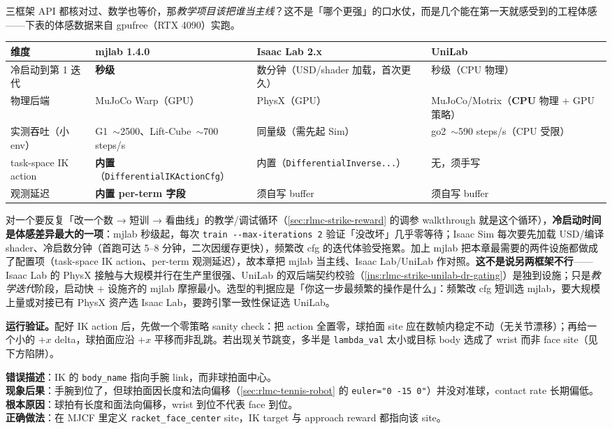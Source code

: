三框架 API 都核对过、数学也等价，那\emph{教学项目该把谁当主线}？这不是「哪个更强」的口水仗，而是几个能在第一天就感受到的工程体感——下表的体感数据来自 gpufree（RTX 4090）实跑。

\begin{center}
\small
\begin{tabular}{@{}llll@{}}
\toprule
维度 & mjlab 1.4.0 & Isaac Lab 2.x & UniLab \\
\midrule
冷启动到第 1 迭代 & \textbf{秒级} & 数分钟（USD/shader 加载，首次更久） & 秒级（CPU 物理） \\
物理后端 & MuJoCo Warp（GPU） & PhysX（GPU） & MuJoCo/Motrix（\textbf{CPU} 物理 $+$ GPU 策略） \\
实测吞吐（小 env） & G1 \,$\sim$2500、Lift-Cube \,$\sim$700 steps/s & 同量级（需先起 Sim） & go2 \,$\sim$590 steps/s（CPU 受限） \\
task-space IK action & \textbf{内置}（\verb|DifferentialIKActionCfg|） & 内置（\verb|DifferentialInverse...|） & 无，须手写 \\
观测延迟 & \textbf{内置 per-term 字段} & 须自写 buffer & 须自写 buffer \\
\bottomrule
\end{tabular}
\end{center}

\noindent{}对一个要反复「改一个数 → 短训 → 看曲线」的教学/调试循环（\cref{sec:rlmc-strike-reward} 的调参 walkthrough 就是这个循环），\textbf{冷启动时间是体感差异最大的一项}：mjlab 秒级起，每次 \verb|train --max-iterations 2| 验证「没改坏」几乎零等待；Isaac Sim 每次要先加载 USD/编译 shader、冷启数分钟（首跑可达 5--8 分钟，二次因缓存更快），频繁改 cfg 的迭代体验受拖累。加上 mjlab 把本章最需要的两件设施都做成了配置项（task-space IK action、per-term 观测延迟），故本章把 mjlab 当主线、Isaac Lab/UniLab 作对照。\textbf{这不是说另两框架不行}——Isaac Lab 的 PhysX 接触与大规模并行在生产里很强、UniLab 的双后端契约校验（\cref{ins:rlmc-strike-unilab-dr-gating}）是独到设施；只是\emph{教学迭代}阶段，启动快 $+$ 设施齐的 mjlab 摩擦最小。选型的判据应是「你这一步最频繁的操作是什么」：频繁改 cfg 短训选 mjlab，要大规模上量或对接已有 PhysX 资产选 Isaac Lab，要跨引擎一致性保证选 UniLab。

\textbf{运行验证。}配好 IK action 后，先做一个零策略 sanity check：把 action 全置零，球拍面 site 应在数帧内稳定不动（无关节漂移）；再给一个小的 $+x$ delta，球拍面应沿 $+x$ 平移而非乱跳。若出现关节跳变，多半是 \verb|lambda_val| 太小或目标 body 选成了 wrist 而非 face site（见下方陷阱）。

\begin{pitfall}
\textbf{错误描述}：IK 的 \verb|body_name| 指向手腕 link，而非球拍面中心。\\
\textbf{现象后果}：手腕到位了，但球拍面因长度和法向偏移（\cref{sec:rlmc-tennis-robot} 的 \verb|euler="0 -15 0"|）并没对准球，contact rate 长期偏低。\\
\textbf{根本原因}：球拍有长度和面法向偏移，wrist 到位不代表 face 到位。\\
\textbf{正确做法}：在 MJCF 里定义 \verb|racket_face_center| site，IK target 与 approach reward 都指向该 site。
\end{pitfall}

